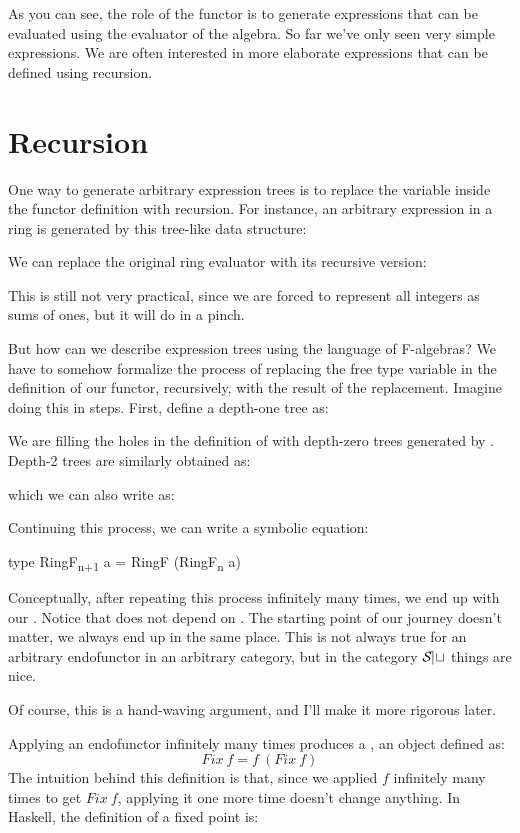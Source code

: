 As you can see, the role of the functor is to generate expressions that
can be evaluated using the evaluator of the algebra. So far we've only
seen very simple expressions. We are often interested in more elaborate
expressions that can be defined using recursion.

\section{Recursion}

One way to generate arbitrary expression trees is to replace the
variable  inside the functor definition with recursion. For
instance, an arbitrary expression in a ring is generated by this
tree-like data structure:

We can replace the original ring evaluator with its recursive version:

This is still not very practical, since we are forced to represent all
integers as sums of ones, but it will do in a pinch.

But how can we describe expression trees using the language of
F-algebras? We have to somehow formalize the process of replacing the
free type variable in the definition of our functor, recursively, with
the result of the replacement. Imagine doing this in steps. First,
define a depth-one tree as:

We are filling the holes in the definition of  with
depth-zero trees generated by . Depth-2 trees are
similarly obtained as:

which we can also write as:

Continuing this process, we can write a symbolic equation:

\begin{snipv}
type RingF\textsubscript{n+1} a = RingF (RingF\textsubscript{n} a)
\end{snipv}
Conceptually, after repeating this process infinitely many times, we end
up with our . Notice that  does not depend on
. The starting point of our journey doesn't matter, we always
end up in the same place. This is not always true for an arbitrary
endofunctor in an arbitrary category, but in the category $\mathcal{S\mkern-3mu et}$
things are nice.

Of course, this is a hand-waving argument, and I'll make it more
rigorous later.

Applying an endofunctor infinitely many times produces a , an object defined as:
\[Fix\ f = f\ (Fix\ f)\]
The intuition behind this definition is that, since we applied
$f$ infinitely many times to get $Fix\ f$, applying it one
more time doesn't change anything. In Haskell, the definition of a fixed
point is:


